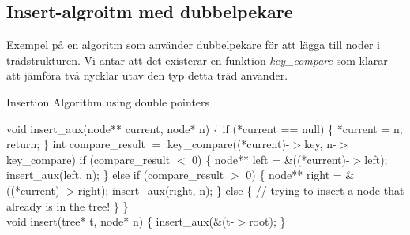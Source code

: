 \documentclass[a4paper]{article}
\begin{document}
			\pagebreak

		\subsection*{Insert-algroitm med dubbelpekare} %

			Exempel på en algoritm som använder dubbelpekare för att lägga till noder i trädstrukturen. Vi antar att det existerar en funktion \emph{key\_compare} som klarar att jämföra två nycklar utav den typ detta träd använder.
			
			\begin{algorithm}
				\caption{Insertion Algorithm using double pointers}
				\label{Insertioin Algorithm, double pointers}
				\begin{algorithmic}[1]
					\State void insert\_aux(node** current, node* n) \{
						\State \hspace{0.5cm} if (*current == null) \{
							\State \hspace{1cm} *current = n;
							\State \hspace{1cm} return;
						\State \hspace{0.5cm} \}
						\State \hspace{0.5cm} int compare\_result $=$ key\_compare((*current)-$>$key, n-$>$key\_compare)
						\State \hspace{0.5cm} if (compare\_result $<$ 0) \{
							\State \hspace{1cm} node** left = \&((*current)-$>$left);
							\State \hspace{1cm} insert\_aux(left, n);
						\State \hspace{0.5cm} \} else if (compare\_result $>$ 0) \{
							\State \hspace{1cm} node** right = \&((*current)-$>$right);
							\State \hspace{1cm} insert\_aux(right, n);
						\State \hspace{0.5cm} \} else \{
							\State \hspace{1cm} // trying to insert a node that already is in the tree!
						\State \hspace{0.5cm} \}
					\State \} \\

					\State void insert(tree* t, node* n) \{
						\State \hspace{0.5cm} insert\_aux(\&(t-$>$root);
					\State \}
				\end{algorithmic}
			\end{algorithm}
\end{document}

